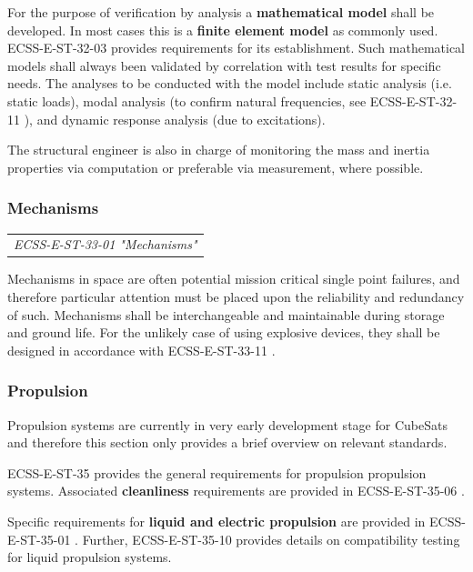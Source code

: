 For the purpose of verification by analysis a \textbf{mathematical model} shall be developed. In most cases this is a \textbf{finite element model} as commonly used. ECSS-E-ST-32-03 \cite{ECSS-E-ST-32-03} provides requirements for its establishment. Such mathematical models shall always been validated by correlation with test results for specific needs. The analyses to be conducted with the model include static analysis (i.e. static loads), modal analysis (to confirm natural frequencies, see ECSS-E-ST-32-11 \cite{ECSS-E-ST-32-11}), and dynamic response analysis (due to excitations).

The structural engineer is also in charge of monitoring the mass and inertia properties via computation or preferable via measurement, where possible. 

\subsubsection{Mechanisms}
\label{ss:Mechanisms}

\begin{tabular}{l}
\textit{ECSS-E-ST-33-01 "Mechanisms" \cite{ECSS-E-ST-33-01}}
\end{tabular}

Mechanisms in space are often potential mission critical single point failures, and therefore particular attention must be placed upon the reliability and redundancy of such. Mechanisms shall be interchangeable and maintainable during storage and ground life. For the unlikely case of using explosive devices, they shall be designed in accordance with ECSS-E-ST-33-11 \cite{ECSS-E-ST-33-11}. 

\subsubsection{Propulsion}

Propulsion systems are currently in very early development stage for CubeSats and therefore this section only provides a brief overview on relevant standards.

ECSS-E-ST-35 \cite{ECSS-E-ST-35} provides the general requirements for propulsion propulsion systems. Associated \textbf{cleanliness} requirements are provided in ECSS-E-ST-35-06 \cite{ECSS-E-ST-35-06}.

Specific requirements for \textbf{liquid and electric propulsion} are provided in ECSS-E-ST-35-01 \cite{}. Further, ECSS-E-ST-35-10 \cite{} provides details on compatibility testing for liquid propulsion systems. 

